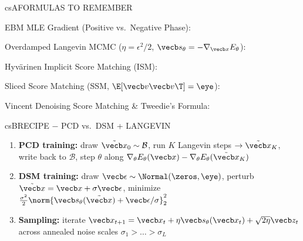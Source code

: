 \documentclass[../../../../master.tex]{subfiles}
\begin{document}
\begin{cscolumns}
\begin{cscard}{csA}{FORMULAS TO REMEMBER}
  \begin{csbul}
    \item EBM MLE Gradient (Positive vs.\ Negative Phase):
    \item Overdamped Langevin MCMC ($\eta=\epsilon^2/2$, $\vecb s_\theta=-\nabla_{\vecb x}E_\theta$):
    \item Hyv\"arinen Implicit Score Matching (ISM):
    \item Sliced Score Matching (SSM, $\E[\vecb v\vecb v\T]=\eye$):
    \item Vincent Denoising Score Matching \& Tweedie's Formula:
  \end{csbul}
\end{cscard}

\begin{cscard}{csB}{RECIPE $-$ PCD vs.\ DSM + LANGEVIN}
  \begin{enumerate}[leftmargin=1.2em, itemsep=1pt, topsep=1pt, parsep=0pt]
    \item \textbf{PCD training:} draw $\tilde{\vecb x}_0\sim\mathcal B$, run $K$ Langevin steps $\to\tilde{\vecb x}_K$, write back to $\mathcal B$, step $\theta$ along $\nabla_\theta E_\theta(\vecb x)-\nabla_\theta E_\theta(\tilde{\vecb x}_K)$
    \item \textbf{DSM training:} draw $\vecb\epsilon\sim\Normal(\zeros,\eye)$, perturb $\tilde{\vecb x}=\vecb x+\sigma\vecb\epsilon$, minimize $\frac{\sigma^2}{2}\norm{\vecb s_\theta(\tilde{\vecb x})+\vecb\epsilon/\sigma}_2^2$
    \item \textbf{Sampling:} iterate $\vecb x_{t+1}=\vecb x_t+\eta\vecb s_\theta(\vecb x_t)+\sqrt{2\eta}\vecb z_t$ across annealed noise scales $\sigma_1>\dots>\sigma_L$
  \end{enumerate}
\end{cscard}
\columnbreak


\end{cscolumns}
\end{document}
